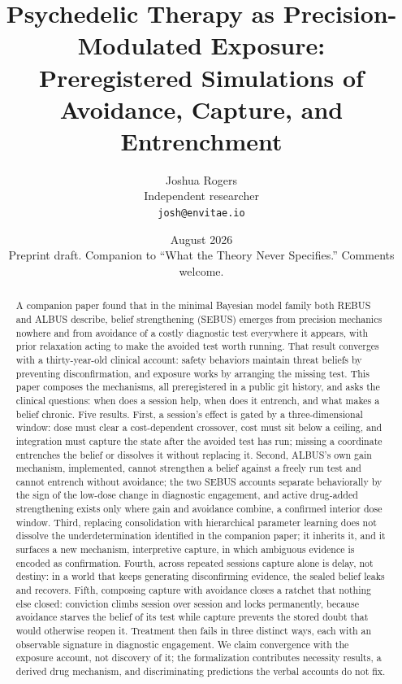 \documentclass[11pt]{article}
\title{\textbf{Psychedelic Therapy as Precision-Modulated Exposure:\\
Preregistered Simulations of Avoidance, Capture, and Entrenchment}}
\author{Joshua Rogers\\ \small Independent researcher \\ \small \texttt{josh@envitae.io}}
\date{August 2026 \\ \small Preprint draft. Companion to ``What the Theory Never
Specifies.'' Comments welcome.}
\begin{document}
\maketitle

\begin{abstract}
\noindent A companion paper found that in the minimal Bayesian model family both
REBUS and ALBUS describe, belief strengthening (SEBUS) emerges from precision
mechanics nowhere and from avoidance of a costly diagnostic test everywhere it
appears, with prior relaxation acting to make the avoided test worth running. That
result converges with a thirty-year-old clinical account: safety behaviors maintain
threat beliefs by preventing disconfirmation, and exposure works by arranging the
missing test. This paper composes the mechanisms, all preregistered in a public
git history, and asks the clinical questions: when does a session help, when does
it entrench, and what makes a belief chronic. Five results. First, a session's
effect is gated by a three-dimensional window: dose must clear a cost-dependent
crossover, cost must sit below a ceiling, and integration must capture the state
after the avoided test has run; missing a coordinate entrenches the belief or
dissolves it without replacing it. Second, ALBUS's own gain mechanism, implemented,
cannot strengthen a belief against a freely run test and cannot entrench without
avoidance; the two SEBUS accounts separate behaviorally by the sign of the
low-dose change in diagnostic engagement, and active drug-added strengthening
exists only where gain and avoidance combine, a confirmed interior dose window.
Third, replacing consolidation with hierarchical parameter learning does not
dissolve the underdetermination identified in the companion paper; it inherits it,
and it surfaces a new mechanism, interpretive capture, in which ambiguous evidence
is encoded as confirmation. Fourth, across repeated sessions capture alone is
delay, not destiny: in a world that keeps generating disconfirming evidence, the
sealed belief leaks and recovers. Fifth, composing capture with avoidance closes a
ratchet that nothing else closed: conviction climbs session over session and locks
permanently, because avoidance starves the belief of its test while capture
prevents the stored doubt that would otherwise reopen it. Treatment then fails in
three distinct ways, each with an observable signature in diagnostic engagement.
We claim convergence with the exposure account, not discovery of it; the
formalization contributes necessity results, a derived drug mechanism, and
discriminating predictions the verbal accounts do not fix.
\end{abstract}
\end{document}
